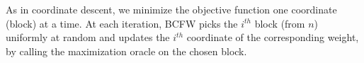 As in coordinate descent, we minimize the objective function one coordinate
(block) at a time. At each iteration, BCFW picks the $i^{th}$ block (from $n$)
uniformly at random and updates the $i^{th}$ coordinate of the corresponding
weight, by calling the maximization oracle on the chosen block.
\begin{algorithmic}
    \\
    \ENDFOR
\end{algorithmic}
